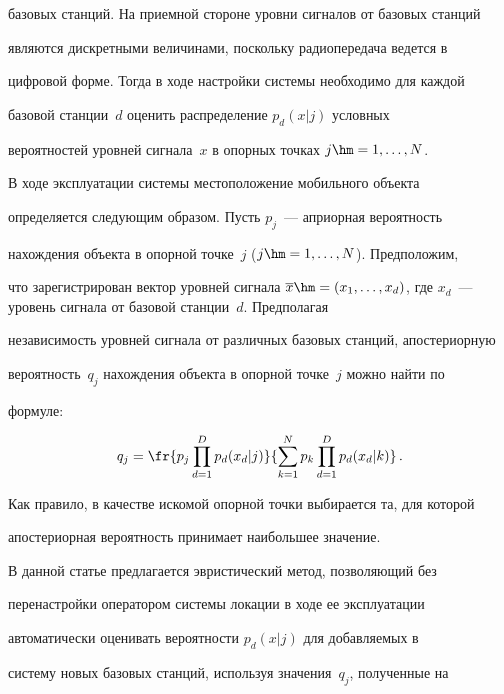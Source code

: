 базовых станций. На приемной стороне уровни сигналов от базовых станций

являются дискретными величинами, поскольку радиопередача ведется в

цифровой форме. Тогда в ходе настройки системы необходимо для каждой

базовой станции~$d$ оценить распределение $p_d(x\vert j)$ условных

вероятностей уровней сигнала~$x$ в опорных точках $j\hm= 1,\ldots , N$.



 В ходе эксплуатации системы местоположение мобильного объекта

определяется следующим образом. Пусть $p_j$~--- априорная вероятность

нахождения объекта в опорной точке~$j$ ($j\hm= 1,\ldots , N$). Предположим,

что зарегистрирован вектор уровней сигнала $\overline{x}\hm= (x_1,\ldots

,x_d)$, где $x_d$~--- уровень сигнала от базовой станции~$d$. Предполагая

независимость уровней сигнала от различных базовых станций, апостериорную

вероятность~$q_j$ нахождения объекта в опорной точке~$j$ можно найти по

формуле:

 \begin{equation}

 q_j= \fr{p_j\prod\limits_{d=1}^D p_d(x_d\vert j)} {\sum\limits_{k=1}^N p_k

\prod\limits_{d=1}^D p_d(x_d\vert k)}\,.

 \label{e1-vor}

 \end{equation}



 Как правило, в качестве искомой опорной точки выбирается та, для которой

апостериорная вероятность принимает наибольшее значение.



 В данной статье предлагается эвристический метод, позволяющий без

перенастройки оператором системы локации в ходе ее эксплуатации

автоматически оценивать вероятности $p_d(x\vert j)$ для добавляемых в

систему новых базовых станций, используя значения~$q_j$, полученные на

